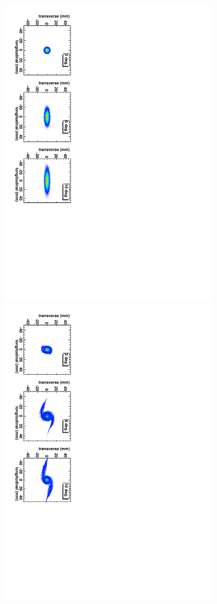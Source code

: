 \documentclass[aps,prstab,twocolumn,superscriptaddress]{revtex4}
\begin{document}
\begin{figure}
  \includegraphics[angle=90,width=0.9\linewidth]{figures/Turn-0.pdf}
  \includegraphics[angle=90,width=0.9\linewidth]{figures/Turn-50.pdf}

\end{figure}
\end{document}
